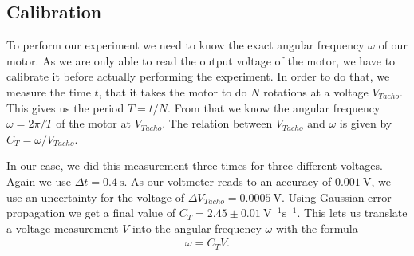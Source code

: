 \subsection{Calibration}

To perform our experiment we need to know the exact angular frequency $\omega$ of our motor.
As we are only able to read the output voltage of the motor, we have to calibrate it before actually performing the experiment.
In order to do that, we measure the time $t$, that it takes the motor to do $N$ rotations at a voltage $V_{Tacho}$.
This gives us the period $T = t/N$.
From that we know the angular frequency  $\omega = 2 \pi/T$  of the motor at $V_{Tacho}$.
The relation between $V_{Tacho}$ and $\omega$ is given by $C_T = \omega/V_{Tacho}$.

In our case, we did this measurement three times for three different voltages.
Again we use $\Delta t = \SI{0.4}{\second}$.
As our voltmeter reads to an accuracy of $\SI{0.001}{\volt}$, we use an uncertainty for the voltage of $\Delta V_{Tacho} = \SI{0.0005}{\volt}$.
Using Gaussian error propagation we get a final value of $C_T = 2.45 \pm \SI{0.01}{\volt^{-1}\second^{-1}}$.
This lets us translate a voltage measurement $V$ into the angular frequency $\omega$ with the formula \begin{align}
	\omega = C_T V.
	\label{eq::calibration}
\end{align}


